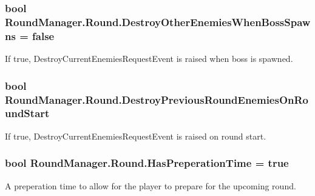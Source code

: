 \subsubsection[{Destroy\+Other\+Enemies\+When\+Boss\+Spawns}]{\setlength{\rightskip}{0pt plus 5cm}bool Round\+Manager.\+Round.\+Destroy\+Other\+Enemies\+When\+Boss\+Spawns = false}\label{class_round_manager_1_1_round_a3efd4fcc0924c9b469d2cc96f1f418cd}


If true, Destroy\+Current\+Enemies\+Request\+Event is raised when boss is spawned. 

\hypertarget{class_round_manager_1_1_round_a037f0609ebfdf5eb6c72be5c9678761d}{}
\subsubsection[{Destroy\+Previous\+Round\+Enemies\+On\+Round\+Start}]{\setlength{\rightskip}{0pt plus 5cm}bool Round\+Manager.\+Round.\+Destroy\+Previous\+Round\+Enemies\+On\+Round\+Start}\label{class_round_manager_1_1_round_a037f0609ebfdf5eb6c72be5c9678761d}


If true, Destroy\+Current\+Enemies\+Request\+Event is raised on round start. 

\hypertarget{class_round_manager_1_1_round_a711e1825e6d269ab0308a79cf25ee8d1}{}
\subsubsection[{Has\+Preperation\+Time}]{\setlength{\rightskip}{0pt plus 5cm}bool Round\+Manager.\+Round.\+Has\+Preperation\+Time = true}\label{class_round_manager_1_1_round_a711e1825e6d269ab0308a79cf25ee8d1}


A preperation time to allow for the player to prepare for the upcoming round. 

\hypertarget{class_round_manager_1_1_round_ae42e5ac4d526b13e552f1b24e5a83a19}{}

